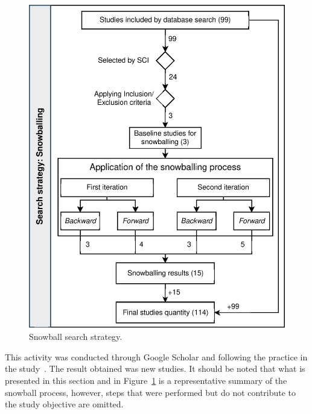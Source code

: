 \begin{figure}
	\centering
	\includegraphics[scale=0.7]{resources/figures/sms-Snowball.eps}
	\caption{Snowball search strategy.}
	\label{figure:Snowball}
\end{figure}

This activity was conducted through Google Scholar and following the practice in the study~\cite{Ali-01}. The result obtained was \snowballNewStudies{} new studies. It should be noted that what is presented in this section and in Figure~\ref{figure:Snowball} is a representative summary of the snowball process, however, steps that were performed but do not contribute to the study objective are omitted.

